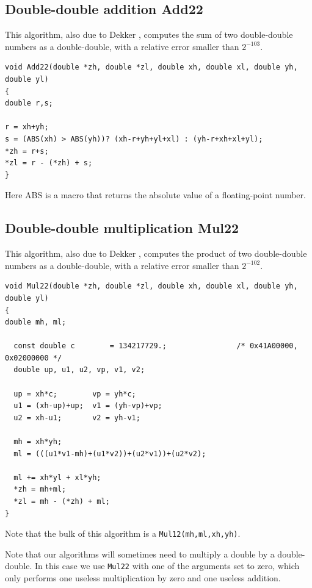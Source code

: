 \subsection{Double-double addition {Add22}}
  
This algorithm, also due to Dekker \cite{Dek71}, computes the sum of
two double-double numbers as a double-double, with a relative error
smaller than $2^{-103}$.

\begin{lstlisting}[label={Add22},caption={Add22},firstnumber=1]
void Add22(double *zh, double *zl, double xh, double xl, double yh, double yl)
{
double r,s;

r = xh+yh;
s = (ABS(xh) > ABS(yh))? (xh-r+yh+yl+xl) : (yh-r+xh+xl+yl);
*zh = r+s;
*zl = r - (*zh) + s;
}
\end{lstlisting}

Here ABS is a macro that returns the absolute value of a floating-point number.




\subsection{Double-double multiplication {Mul22}}
  
This algorithm, also due to Dekker \cite{Dek71}, computes the product of
two double-double numbers as a double-double, with a relative error
smaller than $2^{-102}$.

\begin{lstlisting}[label={Mul22},caption={Mul22},firstnumber=1]
void Mul22(double *zh, double *zl, double xh, double xl, double yh, double yl)
{
double mh, ml;

  const double c        = 134217729.;                /* 0x41A00000, 0x02000000 */ 
  double up, u1, u2, vp, v1, v2;

  up = xh*c;        vp = yh*c;
  u1 = (xh-up)+up;  v1 = (yh-vp)+vp;
  u2 = xh-u1;       v2 = yh-v1;
  
  mh = xh*yh;
  ml = (((u1*v1-mh)+(u1*v2))+(u2*v1))+(u2*v2);

  ml += xh*yl + xl*yh;
  *zh = mh+ml;
  *zl = mh - (*zh) + ml;
}  
\end{lstlisting}

Note that the bulk of this algorithm is a \texttt{Mul12(mh,ml,xh,yh)}.

Note that our algorithms will sometimes need to multiply a double by a
double-double. In this case we use \texttt{Mul22} with one of the
arguments set to zero, which only performs one useless multiplication
by zero and one useless addition.





